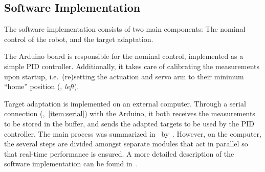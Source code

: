 \subsection{Software Implementation}\label{subsec:software-implement}
The software implementation consists of two main components: The nominal control of the robot, and the target adaptation.

The Arduino board is responsible for the nominal control, implemented as a simple PID controller.
Additionally, it takes care of calibrating the measurements upon startup, i.e.~(re)setting the actuation and servo arm to their minimum ``home'' position (, \emph{left}).

Target adaptation is implemented on an external computer.
Through a serial connection (,~\cref{item:serial}) with the Arduino, it both receives the measurements to be stored in the buffer, and sends the adapted targets to be used by the PID controller.
The main process was summarized in~ by~.
However, on the computer, the several steps are divided amongst separate modules that act in parallel so that real-time performance is ensured.
A more detailed description of the software implementation can be found in~.